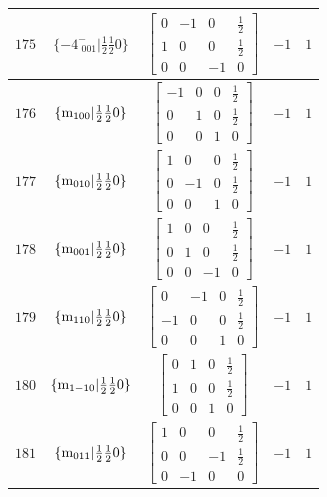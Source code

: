 \documentclass[fleqn,8pt]{jsarticle}
\begin{document}
\begin{longtable}{ccccc}
$ 175 $ & $ \{-4^{-}_{\,\,001}|\frac{1}{2} \frac{1}{2} 0\} $ & $ \begin{bmatrix} 0 & -1 & 0 & \frac{1}{2} \\ 1 & 0 & 0 & \frac{1}{2} \\ 0 & 0 & -1 & 0 \end{bmatrix} $ & $ -1 $ & $ 1 $ \\ \hline
$ 176 $ & $ \{{\rm m}_{100}|\frac{1}{2} \frac{1}{2} 0\} $ & $ \begin{bmatrix} -1 & 0 & 0 & \frac{1}{2} \\ 0 & 1 & 0 & \frac{1}{2} \\ 0 & 0 & 1 & 0 \end{bmatrix} $ & $ -1 $ & $ 1 $ \\ \hline
$ 177 $ & $ \{{\rm m}_{010}|\frac{1}{2} \frac{1}{2} 0\} $ & $ \begin{bmatrix} 1 & 0 & 0 & \frac{1}{2} \\ 0 & -1 & 0 & \frac{1}{2} \\ 0 & 0 & 1 & 0 \end{bmatrix} $ & $ -1 $ & $ 1 $ \\ \hline
$ 178 $ & $ \{{\rm m}_{001}|\frac{1}{2} \frac{1}{2} 0\} $ & $ \begin{bmatrix} 1 & 0 & 0 & \frac{1}{2} \\ 0 & 1 & 0 & \frac{1}{2} \\ 0 & 0 & -1 & 0 \end{bmatrix} $ & $ -1 $ & $ 1 $ \\ \hline
$ 179 $ & $ \{{\rm m}_{110}|\frac{1}{2} \frac{1}{2} 0\} $ & $ \begin{bmatrix} 0 & -1 & 0 & \frac{1}{2} \\ -1 & 0 & 0 & \frac{1}{2} \\ 0 & 0 & 1 & 0 \end{bmatrix} $ & $ -1 $ & $ 1 $ \\ \hline
$ 180 $ & $ \{{\rm m}_{1-10}|\frac{1}{2} \frac{1}{2} 0\} $ & $ \begin{bmatrix} 0 & 1 & 0 & \frac{1}{2} \\ 1 & 0 & 0 & \frac{1}{2} \\ 0 & 0 & 1 & 0 \end{bmatrix} $ & $ -1 $ & $ 1 $ \\ \hline
$ 181 $ & $ \{{\rm m}_{011}|\frac{1}{2} \frac{1}{2} 0\} $ & $ \begin{bmatrix} 1 & 0 & 0 & \frac{1}{2} \\ 0 & 0 & -1 & \frac{1}{2} \\ 0 & -1 & 0 & 0 \end{bmatrix} $ & $ -1 $ & $ 1 $ \\ \hline

\end{longtable}
\end{document}
